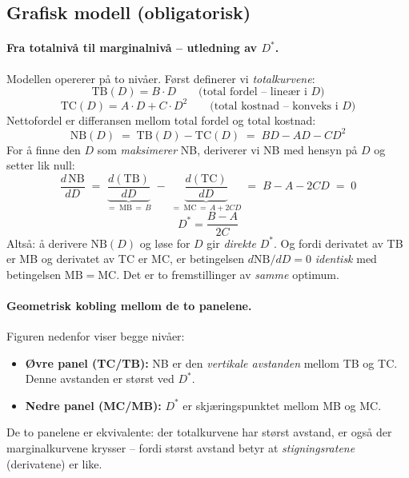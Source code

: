 \subsection*{Grafisk modell (obligatorisk)}

\paragraph{Fra totalnivå til marginalnivå -- utledning av $D^{*}$.}
Modellen opererer på to nivåer. Først definerer vi \emph{totalkurvene}:
\[
  \mathrm{TB}(D) = B \cdot D \qquad \text{(total fordel -- lineær i $D$)}
\]
\[
  \mathrm{TC}(D) = A \cdot D + C \cdot D^{2} \qquad \text{(total kostnad -- konveks i $D$)}
\]
Nettofordel er differansen mellom total fordel og total kostnad:
\[
  \mathrm{NB}(D) \;=\; \mathrm{TB}(D) - \mathrm{TC}(D) \;=\; BD - AD - CD^{2}
\]
For å finne den $D$ som \emph{maksimerer} NB, deriverer vi NB med hensyn på $D$ og setter lik null:
\[
  \frac{d\,\mathrm{NB}}{dD}
  \;=\; \underbrace{\frac{d(\mathrm{TB})}{dD}}_{=\;\mathrm{MB}\,=\,B}
  \;-\; \underbrace{\frac{d(\mathrm{TC})}{dD}}_{=\;\mathrm{MC}\,=\,A+2CD}
  \;=\; B - A - 2CD \;=\; 0
\]
\[
  \boxed{\;D^{*} = \frac{B-A}{2C}\;}
\]
Altså: å derivere $\mathrm{NB}(D)$ og løse for $D$ gir \emph{direkte} $D^{*}$. Og fordi derivatet av TB er MB og derivatet av TC er MC, er betingelsen $d\mathrm{NB}/dD = 0$ \emph{identisk} med betingelsen $\mathrm{MB} = \mathrm{MC}$. Det er to fremstillinger av \emph{samme} optimum.

\paragraph{Geometrisk kobling mellom de to panelene.}
Figuren nedenfor viser begge nivåer:
\begin{itemize}[nosep]
  \item \textbf{Øvre panel (TC/TB):} NB er den \emph{vertikale avstanden} mellom TB og TC. Denne avstanden er størst ved $D^{*}$.
  \item \textbf{Nedre panel (MC/MB):} $D^{*}$ er skjæringspunktet mellom MB og MC.
\end{itemize}
De to panelene er ekvivalente: der totalkurvene har størst avstand, er også der marginalkurvene krysser -- fordi størst avstand betyr at \emph{stigningsratene} (derivatene) er like.

